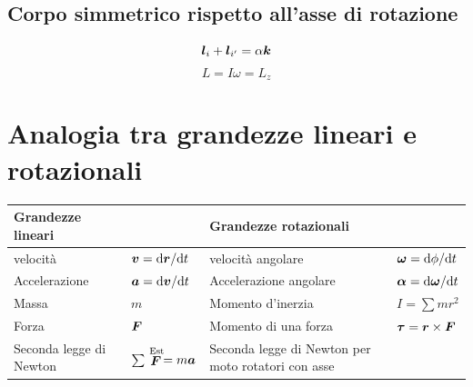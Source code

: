\subsection{Corpo simmetrico rispetto all'asse di rotazione}
\[\boldsymbol{l}_i+\boldsymbol{l}_{i'}=\alpha\boldsymbol{k}\]
\[L=I\omega=L_z\]


\section{Analogia tra grandezze lineari e \mbox{rotazionali}}
\begin{small}
  \begin{tabular}{p{4.0cm}p{2.45cm}p{4.0cm}p{2.38cm}}
    \hline
    Grandezze lineari                                 &                                                                                                                     & Grandezze rotazionali                                 &                              \\
    \hline
    velocità                                          & $\boldsymbol{v}=\mathrm{d} \boldsymbol{r}/\mathrm{d} t$                                                                                             & velocità angolare                                     & $\boldsymbol{\omega}=\mathrm{d} \phi/\mathrm{d} t$   \\
    Accelerazione                                     & $\boldsymbol{a}=\mathrm{d} \boldsymbol{v}/\mathrm{d} t$                                                                                             & Accelerazione
    angolare                                          & $\boldsymbol{\alpha}=\mathrm{d} \boldsymbol{\omega}/\mathrm{d} t$                                                                                                                                                                            \\
    Massa                                             & $m$                                                                                                                 & Momento d'inerzia                                     & $I=\sum mr^2$                \\
    Forza                                             & $\boldsymbol{F}$                                                                                                             & Momento di una forza                                  & $\boldsymbol{\tau}=\boldsymbol{r}\times \boldsymbol{F}$ \\
    Seconda legge di Newton                           & $\sum \stackrel{\text{Est}}{\boldsymbol{F}}=m\boldsymbol{a}$                                                & Seconda legge di Newton per moto rotatori con asse

\end{tabular}
\end{small}
